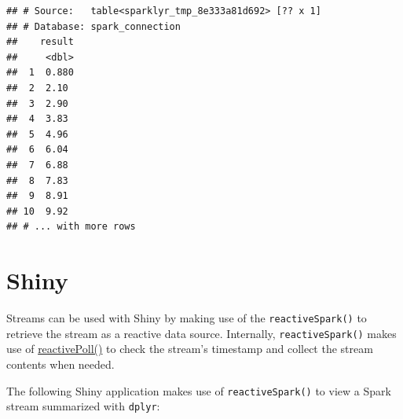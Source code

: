 \documentclass[]{book}
\newenvironment{Shaded}{\begin{snugshade}}{\end{snugshade}}
\newcommand{\ControlFlowTok}[1]{\textcolor[rgb]{0.13,0.29,0.53}{\textbf{#1}}}
\newcommand{\DataTypeTok}[1]{\textcolor[rgb]{0.13,0.29,0.53}{#1}}
\newcommand{\KeywordTok}[1]{\textcolor[rgb]{0.13,0.29,0.53}{\textbf{#1}}}
\newcommand{\NormalTok}[1]{#1}
\newcommand{\OperatorTok}[1]{\textcolor[rgb]{0.81,0.36,0.00}{\textbf{#1}}}
\newcommand{\StringTok}[1]{\textcolor[rgb]{0.31,0.60,0.02}{#1}}
\theoremstyle{definition}
\theoremstyle{definition}
\theoremstyle{definition}
\theoremstyle{remark}
\begin{document}
\begin{verbatim}
## # Source:   table<sparklyr_tmp_8e333a81d692> [?? x 1]
## # Database: spark_connection
##    result
##     <dbl>
##  1  0.880
##  2  2.10 
##  3  2.90 
##  4  3.83 
##  5  4.96 
##  6  6.04 
##  7  6.88 
##  8  7.83 
##  9  8.91 
## 10  9.92 
## # ... with more rows
\end{verbatim}

\hypertarget{shiny}{%
\section{Shiny}\label{shiny}}

Streams can be used with Shiny by making use of the
\texttt{reactiveSpark()} to retrieve the stream as a reactive data
source. Internally, \texttt{reactiveSpark()} makes use of
\href{https://shiny.rstudio.com/reference/shiny/latest/reactivePoll.html}{reactivePoll()}
to check the stream's timestamp and collect the stream contents when
needed.

The following Shiny application makes use of \texttt{reactiveSpark()} to
view a Spark stream summarized with \texttt{dplyr}:

\begin{Shaded}
\end{Shaded}
\end{document}
